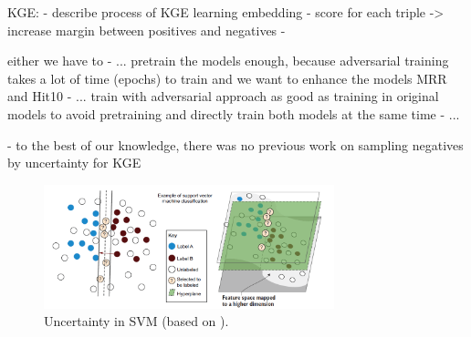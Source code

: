     
    
    
    
    
    
    
    
    
    
KGE: 
- describe process of KGE learning embedding
- score for each triple -> increase margin between positives and negatives
-

either we have to
- ... pretrain the models enough, because adversarial training takes a lot of time (epochs) to train and we want to enhance the models MRR and Hit10
- ... train with adversarial approach as good as training in original models to avoid pretraining and directly train both models at the same time
- ...

- to the best of our knowledge, there was no previous work on sampling negatives by uncertainty for KGE




\begin{figure}[t]
  \centering
    \includegraphics[width=0.75\textwidth]{figures/uncertainty_in_svm.PNG}
  \caption{Uncertainty in \ac{SVM} (based on \cite{human-in-the-loop}).}
  \label{fig:uncertainty_in_svm}
\end{figure}




